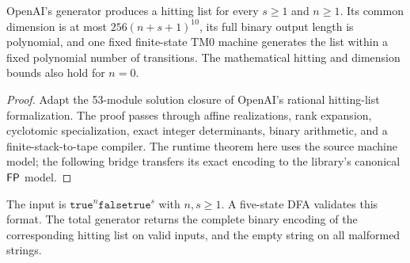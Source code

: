 \begin{theorem}
  \label{thm:rational-hitting-generator}
  \leanok
  OpenAI's generator produces a hitting list for every $s\geq 1$ and $n\geq 1$.
  Its common dimension is at most $256(n+s+1)^{10}$, its full binary output
  length is polynomial, and one fixed finite-state $\mathrm{TM0}$ machine
  generates the list within a fixed polynomial number of transitions.
  The mathematical hitting and dimension bounds also hold for $n=0$.
\end{theorem}
\begin{proof}
  \leanok
  Adapt the 53-module solution closure of OpenAI's rational hitting-list
  formalization. The proof passes through affine realizations, rank expansion,
  cyclotomic specialization, exact integer determinants, binary arithmetic,
  and a finite-stack-to-tape compiler. The runtime theorem here uses the
  source machine model; the following bridge transfers its exact encoding
  to the library's canonical $\mathsf{FP}$ model.
\end{proof}

\begin{definition}
  \label{def:rational-total-generator}
  \leanok
  The input is $\mathtt{true}^n\mathtt{false}\mathtt{true}^s$ with $n,s\geq1$.
  A five-state DFA validates this format. The total generator returns the
  complete binary encoding of the corresponding hitting list on valid
  inputs, and the empty string on all malformed strings.
\end{definition}

